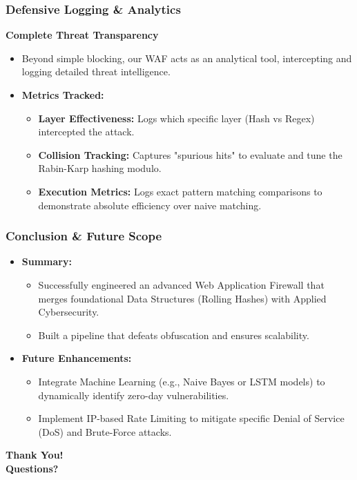 \documentclass{beamer}
\begin{document}
\begin{frame}
\frametitle{Defensive Logging \& Analytics}
\textbf{Complete Threat Transparency}
\begin{itemize}
    \item Beyond simple blocking, our WAF acts as an analytical tool, intercepting and logging detailed threat intelligence.
    \item \textbf{Metrics Tracked:}
    \begin{itemize}
        \item \textbf{Layer Effectiveness:} Logs which specific layer (Hash vs Regex) intercepted the attack.
        \item \textbf{Collision Tracking:} Captures "spurious hits" to evaluate and tune the Rabin-Karp hashing modulo.
        \item \textbf{Execution Metrics:} Logs exact pattern matching comparisons to demonstrate absolute efficiency over naive matching.
    \end{itemize}
\end{itemize}
\end{frame}

\begin{frame}
\frametitle{Conclusion \& Future Scope}
\begin{itemize}
    \item \textbf{Summary:}
    \begin{itemize}
        \item Successfully engineered an advanced Web Application Firewall that merges foundational Data Structures (Rolling Hashes) with Applied Cybersecurity.
        \item Built a pipeline that defeats obfuscation and ensures scalability.
    \end{itemize}
    \vspace{0.3cm}
    \item \textbf{Future Enhancements:}
    \begin{itemize}
        \item Integrate Machine Learning (e.g., Naive Bayes or LSTM models) to dynamically identify zero-day vulnerabilities.
        \item Implement IP-based Rate Limiting to mitigate specific Denial of Service (DoS) and Brute-Force attacks.
    \end{itemize}
\end{itemize}
\vspace{0.5cm}
\begin{center}
    \textbf{Thank You! \\ Questions?}
\end{center}
\end{frame}
\end{document}

